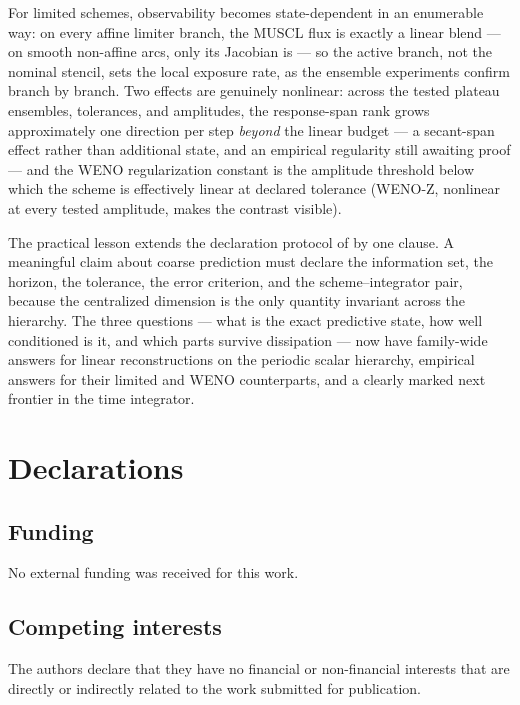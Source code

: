 \documentclass[pdflatex,sn-mathphys-num]{sn-jnl}%
\theoremstyle{thmstyleone}%
\theoremstyle{thmstyletwo}%
\theoremstyle{thmstylethree}%
\begin{document}
For limited schemes, observability becomes state-dependent in an enumerable way: on every affine limiter branch, the MUSCL flux is exactly a linear blend --- on smooth non-affine arcs, only its Jacobian is --- so the active branch, not the nominal stencil, sets the local exposure rate, as the ensemble experiments confirm branch by branch.
Two effects are genuinely nonlinear: across the tested plateau ensembles, tolerances, and amplitudes, the response-span rank grows approximately one direction per step \emph{beyond} the linear budget --- a secant-span effect rather than additional state, and an empirical regularity still awaiting proof --- and the WENO regularization constant is the amplitude threshold below which the scheme is effectively linear at declared tolerance (WENO-Z, nonlinear at every tested amplitude, makes the contrast visible).

The practical lesson extends the declaration protocol of \cite{PolemitisChristakisDrikakis2026FVerasure, PolemitisChristakisDrikakis2026onestep} by one clause.
A meaningful claim about coarse prediction must declare the information set, the horizon, the tolerance, the error criterion, and the scheme--integrator pair, because the centralized dimension is the only quantity invariant across the hierarchy.
The three questions --- what is the exact predictive state, how well conditioned is it, and which parts survive dissipation --- now have family-wide answers for linear reconstructions on the periodic scalar hierarchy, empirical answers for their limited and WENO counterparts, and a clearly marked next frontier in the time integrator.

\section*{Declarations}

\subsection*{Funding}
No external funding was received for this work.

\subsection*{Competing interests}
The authors declare that they have no financial or non-financial interests that are directly or indirectly related to the work submitted for publication.
\end{document}
